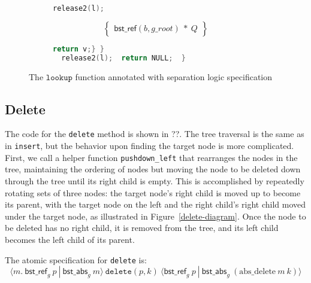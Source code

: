 \documentclass[runningheads]{llncs}
\newcommand{\treerep}{\ensuremath{\mathsf{bst\_abs}}}
\newcommand{\nodeboxrep}{\ensuremath{\mathsf{bst\_ref}}}
\begin{document}
{\begin{figure}[htp]
\begin{subfigure}[t]{1\textwidth}
        \begin{lstlisting}[language = C,  numbers = none]
      release2(l);
         \end{lstlisting}
       $$\left\{\begin{array}{l} \nodeboxrep(b,g\_root)\ *\ Q\end{array}\right\}$$
         \begin{lstlisting}[language = C, numbers = none]
       return v;} }
  release2(l);  return NULL;  }
 \end{lstlisting} 
\end{subfigure}
\caption{The $\texttt{lookup}$ function annotated with separation logic specification}
\label{lookupproof}
\end{figure} }

\subsection{Delete}

The code for the \lstinline{delete} method is shown in ??. %
The tree traversal is the same as in \lstinline{insert}, but the behavior upon finding the target node is more complicated. First, we call a helper function \lstinline{pushdown_left} that rearranges the nodes in the tree, maintaining the ordering of nodes but moving the node to be deleted down through the tree until its right child is empty. This is accomplished by repeatedly rotating sets of three nodes: the target node's right child is moved up to become its parent, with the target node on the left and the right child's right child moved under the target node, as illustrated in Figure~\ref{delete-diagram}.
Once the node to be deleted has no right child, it is removed from the tree, and its left child becomes the left child of its parent.

The atomic specification for \lstinline{delete} is:
$$\langle m.\ \nodeboxrep_g\ p\ |\ \treerep_g\ m\rangle\ \texttt{delete}(p, k)\ \langle \nodeboxrep_g\ p\ |\ \treerep_g\ (\mathrm{abs\_delete}\ m\ k)\rangle$$
\end{document}
